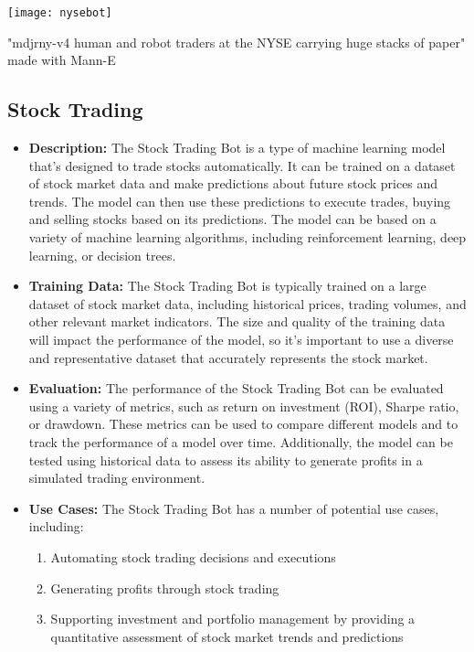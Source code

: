 \begin{marginfigure}[-5.5cm]
        \texttt{[image: nysebot]}
        \caption{"mdjrny-v4 human and robot traders at the NYSE carrying huge stacks of paper" made with Mann-E}
\end{marginfigure}

\subsection{Stock Trading}

\begin{itemize}
    \item \textbf{Description:} The Stock Trading Bot is a type of machine learning model that's designed to trade stocks automatically. It can be trained on a dataset of stock market data and make predictions about future stock prices and trends. The model can then use these predictions to execute trades, buying and selling stocks based on its predictions. The model can be based on a variety of machine learning algorithms, including reinforcement learning, deep learning, or decision trees.
    \item \textbf{Training Data:} The Stock Trading Bot is typically trained on a large dataset of stock market data, including historical prices, trading volumes, and other relevant market indicators. The size and quality of the training data will impact the performance of the model, so it's important to use a diverse and representative dataset that accurately represents the stock market.
    \item \textbf{Evaluation:} The performance of the Stock Trading Bot can be evaluated using a variety of metrics, such as return on investment (ROI), Sharpe ratio, or drawdown. These metrics can be used to compare different models and to track the performance of a model over time. Additionally, the model can be tested using historical data to assess its ability to generate profits in a simulated trading environment.
    \item \textbf{Use Cases:} The Stock Trading Bot has a number of potential use cases, including:
        \begin{enumerate}  
            \item Automating stock trading decisions and executions
            \item Generating profits through stock trading
            \item Supporting investment and portfolio management by providing a quantitative assessment of stock market trends and predictions

\end{enumerate}
\end{itemize}
